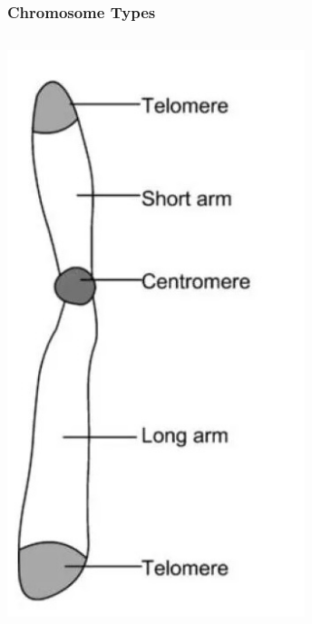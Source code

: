 \documentclass{beamer}
\begin{document}
	
	\begin{frame}
		\frametitle{Chromosome Types}
		\begin{columns}
			\begin{column}{0.5\textwidth}
				
				\centering	\includegraphics[keepaspectratio, width  =0.8\textwidth]{img/chromosomeDiagram} 
			\end{column}
			\begin{column}{0.5\textwidth}

\end{column}
\end{columns}
\end{frame}
\end{document}
